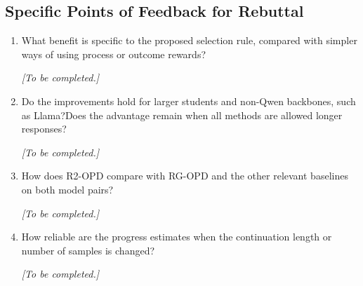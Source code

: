 \documentclass[11pt,a4paper]{article}
\begin{document}
\subsection*{Specific Points of Feedback for Rebuttal}
\begin{enumerate}
\item What benefit is specific to the proposed selection rule, compared with simpler ways of using process or outcome rewards?
\par{}
\begin{responsebox}[frametitle={Response to Q1},nobreak=true]
\textit{[To be completed.]}\par\vspace{1em}
\end{responsebox}

\item Do the improvements hold for larger students and non-Qwen backbones, such as Llama?Does the advantage remain when all methods are allowed longer responses?
\par{}
\begin{responsebox}[frametitle={Response to Q2},nobreak=true]
\textit{[To be completed.]}\par\vspace{1em}
\end{responsebox}

\item How does R2-OPD compare with RG-OPD and the other relevant baselines on both model pairs?
\par{}
\begin{responsebox}[frametitle={Response to Q3},nobreak=true]
\textit{[To be completed.]}\par\vspace{1em}
\end{responsebox}

\item How reliable are the progress estimates when the continuation length or number of samples is changed?
\par{}
\begin{responsebox}[frametitle={Response to Q4},nobreak=true]
\textit{[To be completed.]}\par\vspace{1em}
\end{responsebox}


\end{enumerate}
\end{document}
